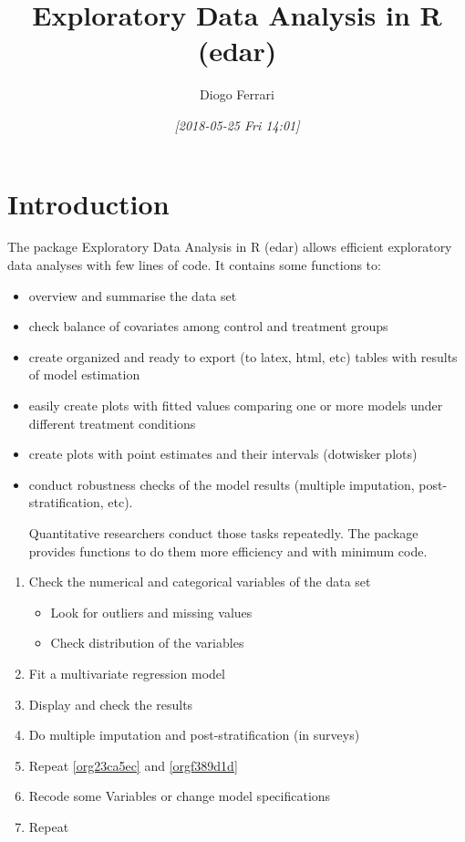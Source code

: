 \documentclass[a4paper]{article}
\author{Diogo Ferrari}
\date{\textit{[2018-05-25 Fri 14:01]}}
\title{Exploratory Data Analysis in R (edar)}
\begin{document}
\maketitle
\tableofcontents


\section{Introduction}
\label{sec:org7e8f689}

The package Exploratory Data Analysis in R (edar) allows efficient exploratory data analyses with few lines of code. It contains some functions to:
\begin{itemize}
\item overview and summarise the data set
\item check balance of covariates among control and treatment groups
\item create organized and ready to export (to latex, html, etc) tables with results of model estimation
\item easily create plots with fitted values comparing one or more models under different treatment conditions
\item create plots with point estimates and their intervals (dotwisker plots)
\item conduct robustness checks of the model results (multiple imputation, post-stratification, etc). 

Quantitative researchers conduct those tasks repeatedly. The package provides functions to do them more efficiency and with minimum code.
\end{itemize}


\begin{enumerate}
\item Check the numerical and categorical variables of the data set
\begin{itemize}
\item Look for outliers and missing values
\item Check distribution of the variables
\end{itemize}
\item \label{org23ca5ec} Fit a multivariate regression model
\item \label{orgf389d1d} Display and check the results
\item Do multiple imputation and post-stratification (in surveys)
\item Repeat \ref{org23ca5ec} and \ref{orgf389d1d}
\item \label{orgfcfa6c3} Recode some Variables or change model specifications
\item Repeat
\end{enumerate}
\end{document}
